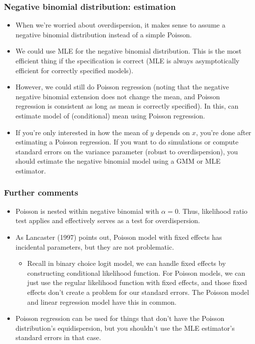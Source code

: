 \documentclass[aspectratio=169,11pt]{beamer}
\begin{document}
\begin{frame}
\frametitle{Negative binomial distribution: estimation}
\begin{itemize}
	\item When we're worried about overdispersion, it makes sense to assume a negative binomial distribution instead of a simple Poisson.

	\smallskip
	\item We could use MLE for the negative binomial distribution. This is the most efficient thing if the specification is correct (MLE is always
		asymptotically efficient for correctly specified models).

	\smallskip
	\item However, we could still do Poisson regression (noting that the negative negative binomial extension does not change the mean, and Poisson
	regression is consistent as long as mean is correctly specified). In this, can estimate model of (conditional) mean using Poisson regression.
	
	\smallskip
	\item If you're only interested in how the mean of $y$ depends on $x$, you're done after estimating a Poisson regression. If you want to do simulations or 
		compute standard
		errors on the variance parameter (robust to overdispersion), you should estimate the negative binomial model using a GMM or MLE estimator. 

\end{itemize}
\end{frame}





\begin{frame}
\frametitle{Further comments}
\begin{itemize}
	\item Poisson is nested within negative binomial with $\alpha=0$. Thus, likelihood ratio test applies and effectively serves as a test
		for overdispersion.

	\item As Lancaster (1997) points out, Poisson model with fixed effects has incidental parameters, but they are not problematic.
	\begin{itemize}
		\item Recall in binary choice logit model, we can handle fixed effects by constructing conditional likelihood function. For Poisson models,
		we can just use the regular likelihood function with fixed effects, and those fixed effects don't create a problem for our standard errors.
		The Poisson model and linear regression model have this in common. 
	\end{itemize}
	
	\item Poisson regression can be used for things that don't have the Poisson distribution's equidispersion, but you
				shouldn't use the MLE estimator's standard errors in that case. 
\end{itemize}
\end{frame}
\end{document}
